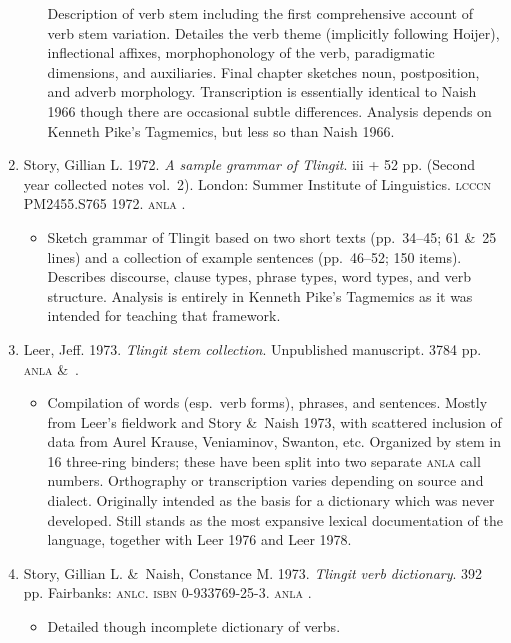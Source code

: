 \documentclass[12pt,letterpaper,oneside,article]{memoir}
\begin{document}
\begin{enumerate}
\begin{itemize}
		Description of verb stem including the first comprehensive account of verb
		stem variation.
		Detailes the verb theme (implicitly following Hoijer), inflectional affixes,
		morphophonology of the verb, paradigmatic dimensions, and auxiliaries.
		Final chapter sketches noun, postposition, and adverb morphology.
		Transcription is essentially identical to Naish 1966 though there are occasional
		subtle differences.
		Analysis depends on Kenneth Pike’s Tagmemics, but less so than Naish 1966.
	\end{itemize}
\item	Story, Gillian L.
	1972.
	\textit{A sample grammar of Tlingit}.
	iii + 52 pp.
	(Second year collected notes vol.\ 2).
	London: Summer Institute of Linguistics.
	\textsc{lcccn} PM2455.S765 1972.
	\textsc{anla} .
	\begin{itemize}
	\item	Sketch grammar of Tlingit based on two short texts (pp.\ 34–45; 61 \&\ 25 lines)
		and a collection of example sentences (pp.\ 46–52; 150 items).
		Describes discourse, clause types, phrase types, word types, and verb structure.
		Analysis is entirely in Kenneth Pike’s Tagmemics as it was intended
		for teaching that framework.
	\end{itemize}
\item	Leer, Jeff.
	1973.
	\textit{Tlingit stem collection}.
	Unpublished manuscript.
	3784 pp.
	\textsc{anla}  \&\ .
	\begin{itemize}
	\item	Compilation of words (esp.\ verb forms), phrases, and sentences.
		Mostly from Leer’s fieldwork and Story \&\ Naish 1973, with scattered
		inclusion of data from Aurel Krause, Veniaminov, Swanton, etc.
		Organized by stem in 16 three-ring binders; these have been split
		into two separate \textsc{anla} call numbers.
		Orthography or transcription varies depending on source and dialect.
		Originally intended as the basis for a dictionary which was never developed.
		Still stands as the most expansive lexical documentation of the language,
		together with Leer 1976 and Leer 1978.
	\end{itemize}
\item	Story, Gillian L. \&\ Naish, Constance M.
	1973.
	\textit{Tlingit verb dictionary}.
	392 pp.
	Fairbanks: \textsc{anlc}.
	\textsc{isbn} 0-933769-25-3.
	\textsc{anla} .
	\begin{itemize}
	\item	Detailed though incomplete dictionary of verbs.

\end{itemize}
\end{enumerate}
\end{document}
